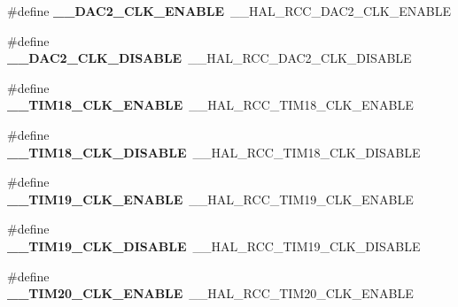 \begin{DoxyCompactItemize}
\item 
\#define {\bfseries \+\_\+\+\_\+\+D\+A\+C2\+\_\+\+C\+L\+K\+\_\+\+E\+N\+A\+B\+LE}~\+\_\+\+\_\+\+H\+A\+L\+\_\+\+R\+C\+C\+\_\+\+D\+A\+C2\+\_\+\+C\+L\+K\+\_\+\+E\+N\+A\+B\+LE\hypertarget{group___h_a_l___r_c_c___aliased_gae4c367c2fb13b1c443b9c2ead24c2589}{}\label{group___h_a_l___r_c_c___aliased_gae4c367c2fb13b1c443b9c2ead24c2589}

\item 
\#define {\bfseries \+\_\+\+\_\+\+D\+A\+C2\+\_\+\+C\+L\+K\+\_\+\+D\+I\+S\+A\+B\+LE}~\+\_\+\+\_\+\+H\+A\+L\+\_\+\+R\+C\+C\+\_\+\+D\+A\+C2\+\_\+\+C\+L\+K\+\_\+\+D\+I\+S\+A\+B\+LE\hypertarget{group___h_a_l___r_c_c___aliased_gacfc9ef4fb5d3565351542b14e6d7830e}{}\label{group___h_a_l___r_c_c___aliased_gacfc9ef4fb5d3565351542b14e6d7830e}

\item 
\#define {\bfseries \+\_\+\+\_\+\+T\+I\+M18\+\_\+\+C\+L\+K\+\_\+\+E\+N\+A\+B\+LE}~\+\_\+\+\_\+\+H\+A\+L\+\_\+\+R\+C\+C\+\_\+\+T\+I\+M18\+\_\+\+C\+L\+K\+\_\+\+E\+N\+A\+B\+LE\hypertarget{group___h_a_l___r_c_c___aliased_ga299d99f2c8deaffbee002dd70a5c8f15}{}\label{group___h_a_l___r_c_c___aliased_ga299d99f2c8deaffbee002dd70a5c8f15}

\item 
\#define {\bfseries \+\_\+\+\_\+\+T\+I\+M18\+\_\+\+C\+L\+K\+\_\+\+D\+I\+S\+A\+B\+LE}~\+\_\+\+\_\+\+H\+A\+L\+\_\+\+R\+C\+C\+\_\+\+T\+I\+M18\+\_\+\+C\+L\+K\+\_\+\+D\+I\+S\+A\+B\+LE\hypertarget{group___h_a_l___r_c_c___aliased_gad29b4581580af1d318589d2c0403f4ab}{}\label{group___h_a_l___r_c_c___aliased_gad29b4581580af1d318589d2c0403f4ab}

\item 
\#define {\bfseries \+\_\+\+\_\+\+T\+I\+M19\+\_\+\+C\+L\+K\+\_\+\+E\+N\+A\+B\+LE}~\+\_\+\+\_\+\+H\+A\+L\+\_\+\+R\+C\+C\+\_\+\+T\+I\+M19\+\_\+\+C\+L\+K\+\_\+\+E\+N\+A\+B\+LE\hypertarget{group___h_a_l___r_c_c___aliased_ga6e908d1b2908430d1ed2af109dd81d31}{}\label{group___h_a_l___r_c_c___aliased_ga6e908d1b2908430d1ed2af109dd81d31}

\item 
\#define {\bfseries \+\_\+\+\_\+\+T\+I\+M19\+\_\+\+C\+L\+K\+\_\+\+D\+I\+S\+A\+B\+LE}~\+\_\+\+\_\+\+H\+A\+L\+\_\+\+R\+C\+C\+\_\+\+T\+I\+M19\+\_\+\+C\+L\+K\+\_\+\+D\+I\+S\+A\+B\+LE\hypertarget{group___h_a_l___r_c_c___aliased_ga3b32538dedb67006d1b9c9aa210ed5f3}{}\label{group___h_a_l___r_c_c___aliased_ga3b32538dedb67006d1b9c9aa210ed5f3}

\item 
\#define {\bfseries \+\_\+\+\_\+\+T\+I\+M20\+\_\+\+C\+L\+K\+\_\+\+E\+N\+A\+B\+LE}~\+\_\+\+\_\+\+H\+A\+L\+\_\+\+R\+C\+C\+\_\+\+T\+I\+M20\+\_\+\+C\+L\+K\+\_\+\+E\+N\+A\+B\+LE\hypertarget{group___h_a_l___r_c_c___aliased_ga1be7819837c9d5ce89b5006858aa2c78}{}\label{group___h_a_l___r_c_c___aliased_ga1be7819837c9d5ce89b5006858aa2c78}


\end{DoxyCompactItemize}
